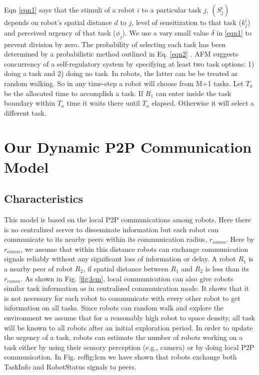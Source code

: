 \documentclass[letterpaper, 10 pt, conference]{ieeeconf}  %
\begin{document}
Eqn \ref{eqn1} says that the stimuli of a robot $i$ to a particular task $j$, $(S_{j}^{i})$ depends on robot's spatial distance $d$ to $j$, level of sensitization to that task ($k_{j}^{i}$) and perceived urgency of that task ($\phi _{j}$). We use a vary small value $\delta$ in \ref{eqn1} to prevent  division by zero. The probability of selecting each task has been determined by a probabilistic method outlined in Eq. \ref{eqn2} . 
AFM suggests concurrency of a self-regulatory system by specifying at least two task options: 1) doing a task and 2) doing no task. In robots, the latter can be   be treated as random walking. So in any time-step a robot will choose from M+1 tasks. Let $T_a$ be the allocated time to accomplish a task. If $R_1$ can enter inside the task boundary within $T_a$ time it waits there until $T_a$ elapsed. Otherwise it will select a different task. 
%
\section{Our Dynamic P2P Communication Model}
\label{sec:comm}
\subsection{Characteristics}
This model is based on the local P2P communications among robots. Here there is no centralized server to disseminate information but each robot can communicate to its nearby peers within its communication radius, $r_{comm}$. Here by $r_{comm}$, we assume that within this distance robots can exchange communication signals reliably without any significant loss of information or delay. A robot $R_1$ is a nearby peer  of robot $R_2$, if spatial distance between $R_1$ and $R_2$ is less than its $r_{comm}$. As shown in Fig. \ref{fig:lcm}, local communication can also give robots similar task information as in centralized communication mode. It shows that  it is not necessary for each robot to communicate with every other robot to get information on all tasks. Since robots can random walk  and explore the environment we assume that for a reasonably high robot to space density, all task will be known to all robots after an initial exploration period. In order to update the urgency of a task, robots can estimate the number of robots working on a task either by using their sensory perception (e.g., camera)  or by doing local P2P communication. In Fig. ref{fig:lcm} we have shown that robots exchange both TaskInfo and RobotStatus signals to peers.
\end{document}
